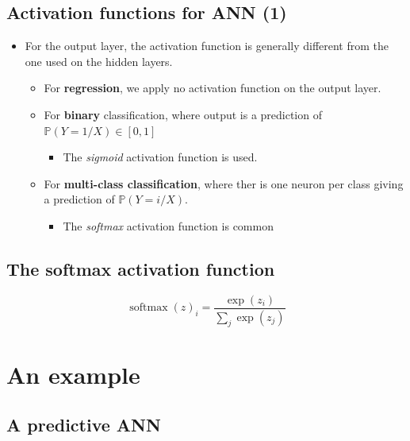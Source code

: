 \documentclass[
  letterpaper,
  DIV=11,
  numbers=noendperiod]{scrartcl}
\providecommand{\tightlist}{%
  \setlength{\itemsep}{0pt}\setlength{\parskip}{0pt}}\usepackage{longtable,booktabs,array}
\begin{document}
\hypertarget{activation-functions-for-ann-1}{%
\subsection{Activation functions for ANN
(1)}\label{activation-functions-for-ann-1}}

\begin{itemize}
\tightlist
\item
  For the output layer, the activation function is generally different
  from the one used on the hidden layers.

  \begin{itemize}
  \tightlist
  \item
    For \textbf{regression}, we apply no activation function on the
    output layer.
  \item
    For \textbf{binary} classification, where output is a prediction of
    \(\mathbb{P}(Y=1 /X) \in [0,1]\)

    \begin{itemize}
    \tightlist
    \item
      The \emph{sigmoid} activation function is used.
    \end{itemize}
  \item
    For \textbf{multi-class classification}, where ther is one neuron
    per class giving a prediction of \(\mathbb{P}(Y=i / X)\).

    \begin{itemize}
    \tightlist
    \item
      The \emph{softmax} activation function is common
    \end{itemize}
  \end{itemize}
\end{itemize}

\hypertarget{the-softmax-activation-function}{%
\subsection{The softmax activation
function}\label{the-softmax-activation-function}}

\[
\operatorname{softmax}(z)_{i}=\frac{\exp \left(z_{i}\right)}{\sum_{j} \exp \left(z_{j}\right)}
\]

\hypertarget{an-example}{%
\section{An example}\label{an-example}}

\hypertarget{a-predictive-ann}{%
\subsection{A predictive ANN}\label{a-predictive-ann}}
\end{document}
